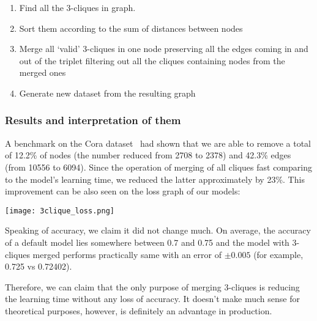 \begin{enumerate}
    \item Find all the 3-cliques in graph.
    \item Sort them according to the sum of distances between nodes
    \item Merge all `valid' 3-cliques in one node preserving all the edges coming in and out of the triplet filtering out all the cliques containing nodes from the merged ones
    \item Generate new dataset from the resulting graph
\end{enumerate}

\subsubsection*{Results and interpretation of them}

A benchmark on the Cora dataset~\cite{cora_dataset} had shown that we are able to remove a total of 12.2\% of nodes (the number reduced from 2708 to 2378) and 42.3\% edges (from 10556 to 6094).
Since the operation of merging of all cliques fast comparing to the model's learning time, we reduced the latter approximately by 23\%.
This improvement can be also seen on the loss graph of our models:

\texttt{[image: 3clique\_loss.png]}

Speaking of accuracy, we claim it did not change much.
On average, the accuracy of a default model lies somewhere between 0.7 and 0.75 and the model with 3-cliques merged performs practically same with an error of $\pm 0.005$ (for example, 0.725 vs 0.72402).

Therefore, we can claim that the only purpose of merging 3-cliques is reducing the learning time without any loss of accuracy.
It doesn't make much sense for theoretical purposes, however, is definitely an advantage in production.
